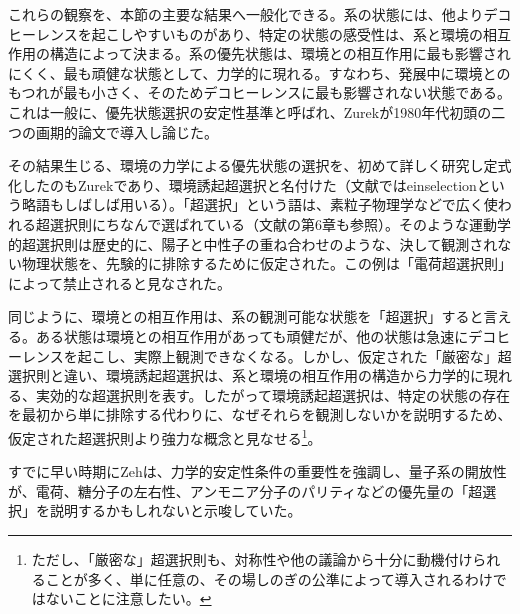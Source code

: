 これらの観察を、本節の主要な結果へ一般化できる。系の状態には、他よりデコヒーレンスを起こしやすいものがあり、特定の状態の感受性は、系と環境の相互作用の構造によって決まる。系の優先状態は、環境との相互作用に最も影響されにくく、最も頑健な状態として、力学的に現れる。すなわち、発展中に環境とのもつれが最も小さく、そのためデコヒーレンスに最も影響されない状態である。これは一般に、優先状態選択の安定性基準と呼ばれ、Zurekが1980年代初頭の二つの画期的論文\cite{ref008,ref009}で導入し論じた。

その結果生じる、環境の力学による優先状態の選択を、初めて詳しく研究し定式化したのもZurek\cite{ref008,ref009}であり、環境誘起超選択と名付けた（文献ではeinselectionという略語もしばしば用いる）。「超選択」という語は、素粒子物理学などで広く使われる超選択則\cite{ref078,ref079,ref080,ref081,ref082,ref083}にちなんで選ばれている（文献\cite{ref017}の第6章も参照）。そのような運動学的超選択則は歴史的に、陽子と中性子の重ね合わせのような、決して観測されない物理状態を、先験的に排除するために仮定された。この例は「電荷超選択則」によって禁止されると見なされた。

同じように、環境との相互作用は、系の観測可能な状態を「超選択」すると言える。ある状態は環境との相互作用があっても頑健だが、他の状態は急速にデコヒーレンスを起こし、実際上観測できなくなる。しかし、仮定された「厳密な」超選択則と違い、環境誘起超選択は、系と環境の相互作用の構造から力学的に現れる、実効的な超選択則を表す。したがって環境誘起超選択は、特定の状態の存在を最初から単に排除する代わりに、なぜそれらを観測しないかを説明するため\cite{ref004,ref008,ref009,ref083,ref084,ref085}、仮定された超選択則より強力な概念と見なせる\footnote{ただし、「厳密な」超選択則も、対称性や他の議論から十分に動機付けられることが多く、単に任意の、その場しのぎの公準によって導入されるわけではないことに注意したい。}。

\hypertarget{srcpage:74}{}\label{srcpage:74}
すでに早い時期にZeh\cite{ref004}は、力学的安定性条件の重要性を強調し、量子系の開放性が、電荷、糖分子の左右性、アンモニア分子のパリティなどの優先量の「超選択」を説明するかもしれないと示唆していた。

